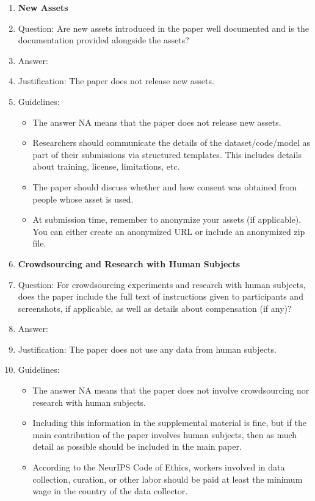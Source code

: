 \documentclass{article} %
\newcounter{ct}
\theoremstyle{definition}
\theoremstyle{remark}
\begin{document}
\begin{enumerate}
\item {\bf New Assets}
    \item[] Question: Are new assets introduced in the paper well documented and is the documentation provided alongside the assets?
    \item[] Answer: \answerNA{} %
    \item[] Justification: The paper does not release new assets.
    \item[] Guidelines:
    \begin{itemize}
        \item The answer NA means that the paper does not release new assets.
        \item Researchers should communicate the details of the dataset/code/model as part of their submissions via structured templates. This includes details about training, license, limitations, etc.
        \item The paper should discuss whether and how consent was obtained from people whose asset is used.
        \item At submission time, remember to anonymize your assets (if applicable). You can either create an anonymized URL or include an anonymized zip file.
    \end{itemize}

\item {\bf Crowdsourcing and Research with Human Subjects}
    \item[] Question: For crowdsourcing experiments and research with human subjects, does the paper include the full text of instructions given to participants and screenshots, if applicable, as well as details about compensation (if any)?
    \item[] Answer: \answerNA{} %
    \item[] Justification: The paper does not use any data from human subjects.
    \item[] Guidelines:
    \begin{itemize}
        \item The answer NA means that the paper does not involve crowdsourcing nor research with human subjects.
        \item Including this information in the supplemental material is fine, but if the main contribution of the paper involves human subjects, then as much detail as possible should be included in the main paper.
        \item According to the NeurIPS Code of Ethics, workers involved in data collection, curation, or other labor should be paid at least the minimum wage in the country of the data collector.
    \end{itemize}


\end{enumerate}
\end{document}
